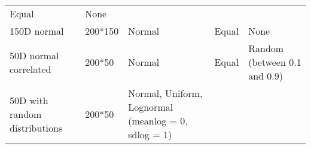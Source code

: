\documentclass[]{article}
\begin{document}
\begin{longtable}[]{@{}lllll@{}}
\begin{minipage}[t]{0.21\columnwidth}
Equal\strut
\end{minipage} & \begin{minipage}[t]{0.13\columnwidth}\raggedright\strut
None\strut
\end{minipage}\tabularnewline
\begin{minipage}[t]{0.12\columnwidth}\raggedright\strut
150D normal\strut
\end{minipage} & \begin{minipage}[t]{0.08\columnwidth}\raggedright\strut
200*150\strut
\end{minipage} & \begin{minipage}[t]{0.31\columnwidth}\raggedright\strut
Normal\strut
\end{minipage} & \begin{minipage}[t]{0.21\columnwidth}\raggedright\strut
Equal\strut
\end{minipage} & \begin{minipage}[t]{0.13\columnwidth}\raggedright\strut
None\strut
\end{minipage}\tabularnewline
\begin{minipage}[t]{0.12\columnwidth}\raggedright\strut
50D normal correlated\strut
\end{minipage} & \begin{minipage}[t]{0.08\columnwidth}\raggedright\strut
200*50\strut
\end{minipage} & \begin{minipage}[t]{0.31\columnwidth}\raggedright\strut
Normal\strut
\end{minipage} & \begin{minipage}[t]{0.21\columnwidth}\raggedright\strut
Equal\strut
\end{minipage} & \begin{minipage}[t]{0.13\columnwidth}\raggedright\strut
Random (between 0.1 and 0.9)\strut
\end{minipage}\tabularnewline
\begin{minipage}[t]{0.12\columnwidth}\raggedright\strut
50D with random distributions\strut
\end{minipage} & \begin{minipage}[t]{0.08\columnwidth}\raggedright\strut
200*50\strut
\end{minipage} & \begin{minipage}[t]{0.31\columnwidth}\raggedright\strut
Normal, Uniform, Lognormal (meanlog = 0, sdlog = 1)\strut
\end{minipage} & \begin{minipage}[t]{0.21\columnwidth}\raggedright\strut

\end{minipage}
\end{longtable}
\end{document}
